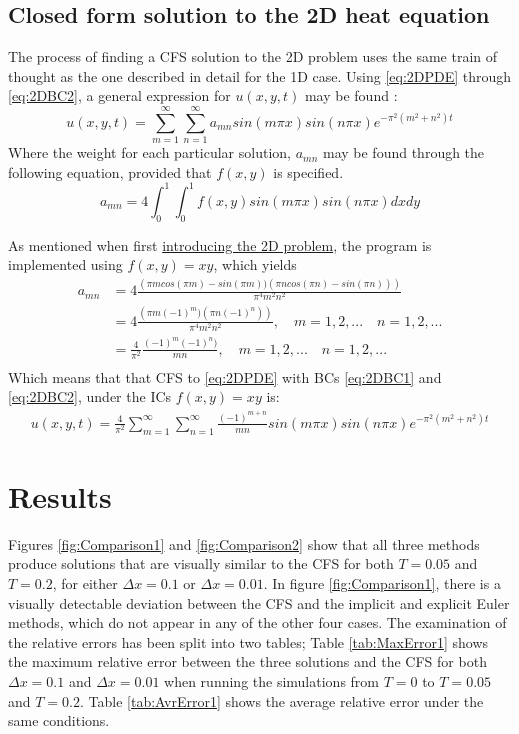 \documentclass[%
oneside,                 %
final,                   %
10pt]{article}
\begin{document}
\subsection{Closed form solution to the 2D heat equation}
\label{M.CFS2D}
The process of finding a CFS solution to the 2D problem uses the same train of thought as the one described in detail for the 1D case. Using \eqref{eq:2DPDE} through \eqref{eq:2DBC2}, a general expression for $u(x,y,t)$ may be found \cite[pp. 284-286]{ravi}:
\begin{equation}
u(x,y,t)=\sum_{m=1}^{\infty} \sum_{n=1}^{\infty} a_{mn} sin(m \pi x) sin (n \pi x) e^{-\pi^2(m^2+n^2)t} 
\end{equation}
Where the weight for each particular solution, $a_{mn}$ may be found through the following equation, provided that $f(x,y)$ is specified.
\begin{equation}
a_{mn}=4 \int_0^1 \int_0^1 f(x,y)  sin(m \pi x) sin(n \pi x) dx dy 
\end{equation}

As mentioned when first \hyperref[M.2dmod]{introducing the 2D problem}, the program is implemented using $f(x,y)=xy$, which yields
\begin{align*}
a_{mn}&=4 \frac{\left(\pi m cos(\pi m) - sin(\pi m)) (\pi n cos(\pi n) - sin(\pi n))\right)}{\pi^4 m^2 n^2}\\
&=4 \frac{\left(\pi m (-1)^m) (\pi n (-1)^n)\right)}{\pi^4 m^2 n^2}, \quad m=1,2,... \quad n=1,2,...\\
&=\frac{4}{\pi^2} \frac{ (-1)^m  (-1)^n)}{ m n}, \quad m=1,2,... \quad n=1,2,...\\
\end{align*}
Which means that that CFS to \eqref{eq:2DPDE} with BCs \eqref{eq:2DBC1} and \eqref{eq:2DBC2}, under the ICs $f(x,y)=xy$ is:
\begin{align}
u(x,y,t)= \frac{4}{\pi^2} \sum_{m=1}^{\infty} \sum_{n=1}^{\infty} \frac{ (-1)^{m+n}}{ m n} sin(m \pi x) sin (n \pi x) e^{-\pi^2(m^2+n^2)t}
\end{align}
\section{Results}
Figures \ref{fig:Comparison1} and \ref{fig:Comparison2} show that all three methods produce solutions that are visually similar to the CFS for both $T=0.05$ and $T=0.2$, for either $\Delta x =0.1$ or $\Delta x =0.01$. In figure \ref{fig:Comparison1}, there is a visually detectable deviation between the CFS and the implicit and explicit Euler methods, which do not appear in any of the other four cases. \newline
The examination of the relative errors has been split into two tables; Table \ref{tab:MaxError1} shows the maximum relative error between the three solutions and the CFS for both $\Delta x=0.1$ and $\Delta x=0.01$ when running the simulations from $T=0$ to $T=0.05$ and $T=0.2$. Table \ref{tab:AvrError1} shows the average relative error under the same conditions.
\end{document}

